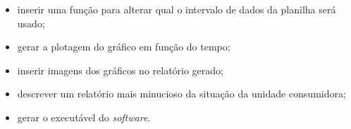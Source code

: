 \begin{itemize}
  \item  inserir uma função para alterar qual o intervalo de dados da planilha será usado;
  \item gerar a plotagem do gráfico em função do tempo;
  \item inserir imagens dos gráficos no relatório gerado;
  \item descrever um relatório mais minucioso da situação da unidade consumidora;
  \item gerar o executável do \textit{software}.
\end{itemize}



